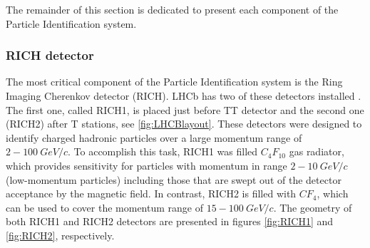 The remainder of this section is dedicated to present each component of the Particle Identification system.


\subsubsection{RICH detector}

The most critical component of the Particle Identification system is the Ring Imaging Cherenkov detector (RICH). LHCb has two of these detectors installed \cite{RICH_performance}. The first one, called RICH1, is placed just before TT detector and the second one (RICH2) after T stations, see \ref{fig:LHCBlayout}. These detectors were designed to identify charged hadronic particles over a large momentum range of $2-100~ GeV/c$. To accomplish this task, RICH1 was filled $C_4F_{10}$ gas radiator, which provides sensitivity for particles with momentum in range $2-10~ GeV/c$ (low-momentum particles) including those that are swept out of the detector acceptance by the magnetic field. In contrast, RICH2 is filled with $CF_4$, which can be used to cover the momentum range of $15-100~ GeV/c$. The geometry of both RICH1 and RICH2 detectors are presented in figures \ref{fig:RICH1} and \ref{fig:RICH2}, respectively. 



